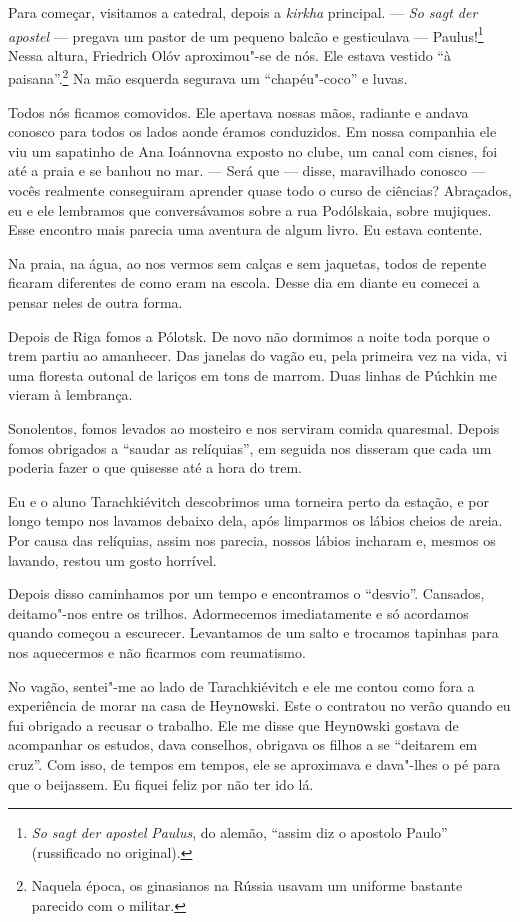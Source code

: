 Para começar, visitamos a catedral, depois a \emph{kirkha} principal.
--- \emph{So sagt der apostel} --- pregava um pastor de um pequeno
balcão e gesticulava --- Paulus!\footnote{\emph{So sagt der apostel}
  \emph{Paulus}, do alemão, ``assim diz o apostolo Paulo'' (russificado
  no original).} Nessa altura, Friedrich Olóv aproximou"-se de nós. Ele
estava vestido ``à paisana''.\footnote{Naquela época, os ginasianos na
  Rússia usavam um uniforme bastante parecido com o militar.} Na mão
esquerda segurava um ``chapéu"-coco'' e luvas.

Todos nós ficamos comovidos. Ele apertava nossas mãos, radiante e andava
conosco para todos os lados aonde éramos conduzidos. Em nossa companhia
ele viu um sapatinho de Ana Ioánnovna exposto no clube, um canal com
cisnes, foi até a praia e se banhou no mar. --- Será que --- disse,
maravilhado conosco --- vocês realmente conseguiram aprender quase todo
o curso de ciências? Abraçados, eu e ele lembramos que conversávamos
sobre a rua Podólskaia, sobre mujiques. Esse encontro mais parecia uma
aventura de algum livro. Eu estava contente.

Na praia, na água, ao nos vermos sem calças e sem jaquetas, todos de
repente ficaram diferentes de como eram na escola. Desse dia em diante
eu comecei a pensar neles de outra forma.

Depois de Riga fomos a Pólotsk. De novo não dormimos a noite toda porque
o trem partiu ao amanhecer. Das janelas do vagão eu, pela primeira vez
na vida, vi uma floresta outonal de lariços em tons de marrom. Duas
linhas de Púchkin me vieram à lembrança.

Sonolentos, fomos levados ao mosteiro e nos serviram comida quaresmal.
Depois fomos obrigados a ``saudar as relíquias'', em seguida nos
disseram que cada um poderia fazer o que quisesse até a hora do trem.

Eu e o aluno Tarachkiévitch descobrimos uma torneira perto da estação, e
por longo tempo nos lavamos debaixo dela, após limparmos os lábios
cheios de areia. Por causa das relíquias, assim nos parecia, nossos
lábios incharam e, mesmos os lavando, restou um gosto horrível.

Depois disso caminhamos por um tempo e encontramos o ``desvio''.
Cansados, deitamo"-nos entre os trilhos. Adormecemos imediatamente e só
acordamos quando começou a escurecer. Levantamos de um salto e trocamos
tapinhas para nos aquecermos e não ficarmos com reumatismo.

No vagão, sentei"-me ao lado de Tarachkiévitch e ele me contou como fora
a experiência de morar na casa de Heynоwski. Este o contratou no verão
quando eu fui obrigado a recusar o trabalho. Ele me disse que Heynоwski
gostava de acompanhar os estudos, dava conselhos, obrigava os filhos a
se ``deitarem em cruz''. Com isso, de tempos em tempos, ele se
aproximava e dava"-lhes o pé para que o beijassem. Eu fiquei feliz por
não ter ido lá.

